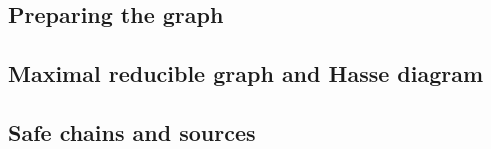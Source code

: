 
\subsection{Preparing the graph}\label{section:preparing-the-graph}

\subsection{Maximal reducible graph and Hasse diagram}\label{section:gm-hassediagram}

\subsection{Safe chains and sources}\label{section:safe-chains-sources}
